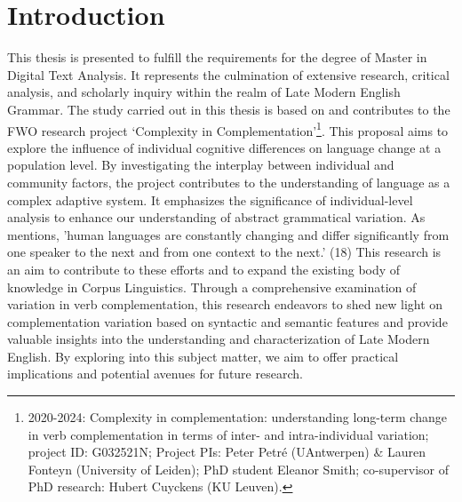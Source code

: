 \documentclass[final]{clv3} %
\begin{document}
\section{Introduction}
This thesis is presented to fulfill the requirements for the degree of Master in Digital Text Analysis. It represents the culmination of extensive research, critical analysis, and scholarly inquiry within the realm of Late Modern English Grammar. The study carried out in this thesis is based on and contributes to the FWO research project ‘Complexity in Complementation'\footnote[1]{2020-2024: Complexity in complementation: understanding long-term change in verb complementation in terms of inter- and intra-individual variation; project ID: G032521N; Project PIs: Peter Petré (UAntwerpen) & Lauren Fonteyn (University of Leiden); PhD student Eleanor Smith; co-supervisor of PhD research: Hubert Cuyckens (KU Leuven).}. This proposal aims to explore the influence of individual cognitive differences on language change at a population level. By investigating the interplay between individual and community factors, the project contributes to the understanding of language as a complex adaptive system. It emphasizes the significance of individual-level analysis to enhance our understanding of abstract grammatical variation. As \citet{steels2000language} mentions, 'human languages are constantly changing and differ significantly from one speaker to the next and from one context to the next.' (18) This research is an aim to contribute to these efforts and to expand the existing body of knowledge in Corpus Linguistics. Through a comprehensive examination of variation in verb complementation, this research endeavors to shed new light on complementation variation based on syntactic and semantic features and provide valuable insights into the understanding and characterization of Late Modern English. By exploring into this subject matter, we aim to offer practical implications and potential avenues for future research.
\end{document}
